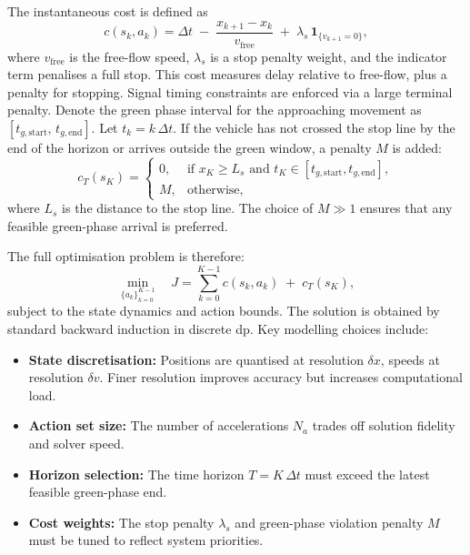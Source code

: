 The instantaneous cost is defined as
\[
c(s_k,a_k) 
= \Delta t \;-\; \frac{x_{k+1}-x_k}{v_{\mathrm{free}}}
\;+\;\lambda_s\,\mathbf{1}_{\{v_{k+1}=0\}},
\]
where $v_{\mathrm{free}}$ is the free-flow speed, $\lambda_s$ is a stop penalty weight, and the indicator term penalises a full stop. This cost measures delay relative to free-flow, plus a penalty for stopping.
\mynewline
Signal timing constraints are enforced via a large terminal penalty. Denote the green phase interval for the approaching movement as $[t_{g,\mathrm{start}},\,t_{g,\mathrm{end}}]$. Let $t_k=k\,\Delta t$. If the vehicle has not crossed the stop line by the end of the horizon or arrives outside the green window, a penalty $M$ is added:
\[
c_T(s_K) = 
\begin{cases}
0, & \text{if } x_K \ge L_s \text{ and } t_K\in[t_{g,\mathrm{start}},t_{g,\mathrm{end}}],\\
M, & \text{otherwise},
\end{cases}
\]
where $L_s$ is the distance to the stop line. The choice of $M\gg1$ ensures that any feasible green-phase arrival is preferred.

The full optimisation problem is therefore:
\[
\min_{\{a_k\}_{k=0}^{K-1}}
\quad
J = \sum_{k=0}^{K-1} c(s_k,a_k)\;+\;c_T(s_K),
\]
subject to the state dynamics and action bounds. The solution is obtained by standard backward induction in discrete \ac{dp}.
\mynewline
Key modelling choices include:
\begin{itemize}
  \item \textbf{State discretisation:} Positions are quantised at resolution $\delta x$, speeds at resolution $\delta v$. Finer resolution improves accuracy but increases computational load.
  \item \textbf{Action set size:} The number of accelerations $N_a$ trades off solution fidelity and solver speed.
  \item \textbf{Horizon selection:} The time horizon $T=K\,\Delta t$ must exceed the latest feasible green-phase end.
  \item \textbf{Cost weights:} The stop penalty $\lambda_s$ and green-phase violation penalty $M$ must be tuned to reflect system priorities.
\end{itemize}

